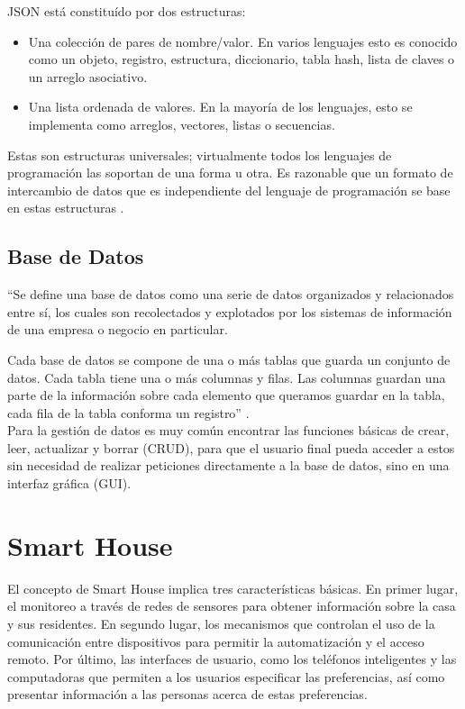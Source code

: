 JSON está constituído por dos estructuras:

\begin{itemize}
	\item Una colección de pares de nombre/valor. En varios lenguajes esto es conocido como un objeto, registro, estructura, diccionario, tabla hash, lista de claves o un arreglo asociativo.
	
	\item Una lista ordenada de valores. En la mayoría de los lenguajes, esto se implementa como arreglos, vectores, listas o secuencias.
\end{itemize}

Estas son estructuras universales; virtualmente todos los lenguajes de programación las soportan de una forma u otra. Es razonable que un formato de intercambio de datos que es independiente del lenguaje de programación se base en estas estructuras \cite{JSON}.

\subsection{Base de Datos}

``Se define una base de datos como una serie de datos organizados y relacionados entre sí, los cuales son recolectados y explotados por los sistemas de información de una empresa o negocio en particular.

Cada base de datos se compone de una o más tablas que guarda un conjunto de datos. Cada tabla tiene una o más columnas y filas. Las columnas guardan una parte de la información sobre cada elemento que queramos guardar en la tabla, cada fila de la tabla conforma un registro'' \cite{DB}. \\

Para la gestión de datos es muy común encontrar las funciones básicas de crear, leer, actualizar y borrar (CRUD), para que el usuario final pueda acceder a estos sin necesidad de realizar peticiones directamente a la base de datos, sino en una interfaz gráfica (GUI).

\section{Smart House}

El concepto de Smart House implica tres características básicas. En primer lugar, el monitoreo a través de redes de sensores para obtener información sobre la casa y sus residentes. En segundo lugar, los mecanismos que controlan el uso de la comunicación entre dispositivos para permitir la automatización y el acceso remoto. Por último, las interfaces de usuario, como los teléfonos inteligentes y las computadoras que permiten a los usuarios especificar las preferencias, así como presentar información a las personas acerca de estas preferencias. \\

